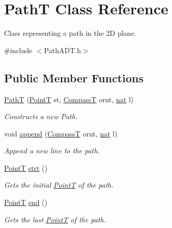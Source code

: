 \hypertarget{class_path_t}{}\section{PathT Class Reference}
\label{class_path_t}


Class representing a path in the 2D plane.  




{\ttfamily \#include $<$Path\+A\+D\+T.\+h$>$}

\subsection*{Public Member Functions}
\begin{DoxyCompactItemize}
\item 
\mbox{\hyperlink{class_path_t_af4d989217199e7e981bd939925a28243}{PathT}} (\mbox{\hyperlink{class_point_t}{PointT}} st, \mbox{\hyperlink{_map_types_8h_a02f3db508dc0c595c2572f474f14b2fa}{CompassT}} ornt, \mbox{\hyperlink{_path_a_d_t_8h_a56638ee9d162e8cce3a15f92d2023d6e}{nat}} l)
\begin{DoxyCompactList}\small\item\em Constructs a new Path. \end{DoxyCompactList}\item 
void \mbox{\hyperlink{class_path_t_a4c8da4849d7547b64824d82021412d3a}{append}} (\mbox{\hyperlink{_map_types_8h_a02f3db508dc0c595c2572f474f14b2fa}{CompassT}} ornt, \mbox{\hyperlink{_path_a_d_t_8h_a56638ee9d162e8cce3a15f92d2023d6e}{nat}} l)
\begin{DoxyCompactList}\small\item\em Append a new line to the path. \end{DoxyCompactList}\item 
\mbox{\hyperlink{class_point_t}{PointT}} \mbox{\hyperlink{class_path_t_a5aab4a4082e4772ff4c52834f3bec7e2}{strt}} ()
\begin{DoxyCompactList}\small\item\em Gets the initial \mbox{\hyperlink{class_point_t}{PointT}} of the path. \end{DoxyCompactList}\item 
\mbox{\hyperlink{class_point_t}{PointT}} \mbox{\hyperlink{class_path_t_a7bc47a3ad8ea135e82458381f9e6985b}{end}} ()
\begin{DoxyCompactList}\small\item\em Gets the last \mbox{\hyperlink{class_point_t}{PointT}} of the path. \end{DoxyCompactList}\item 

\end{DoxyCompactItemize}
